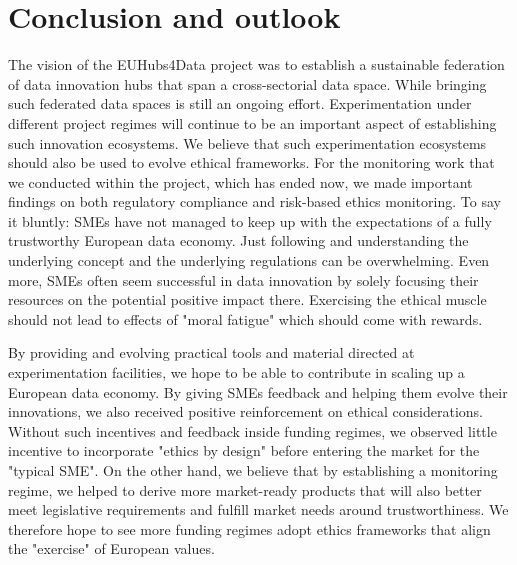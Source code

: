 \section{Conclusion and outlook}
The vision of the EUHubs4Data project was to establish a sustainable federation of data innovation hubs that span a cross-sectorial data space. While bringing such federated data spaces is still an ongoing effort. Experimentation under different project regimes will continue to be an important aspect of establishing such innovation ecosystems. We believe that such experimentation ecosystems should also be used to evolve ethical frameworks. For the monitoring work that we conducted within the project, which has ended now, we made important findings on both regulatory compliance and risk-based ethics monitoring. To say it bluntly: SMEs have not managed to keep up with the expectations of a fully trustworthy European data economy. Just following and understanding the underlying concept and the underlying regulations can be overwhelming. Even more,  SMEs often seem successful in data innovation by solely focusing their resources on the potential positive impact there. Exercising the ethical muscle should not lead to effects of "moral fatigue" which should come with rewards.

By providing and evolving practical tools and material directed at experimentation facilities, we hope to be able to contribute in scaling up a European data economy. By giving SMEs feedback and helping them evolve their innovations, we also received positive reinforcement on ethical considerations. Without such incentives and feedback inside funding regimes, we observed little incentive to incorporate "ethics by design" before entering the market for the "typical SME". On the other hand, we believe that by establishing a monitoring regime, we helped to derive more market-ready products that will also better meet legislative requirements and fulfill market needs around trustworthiness. We therefore hope to see more funding regimes adopt ethics frameworks that align the "exercise" of European values.